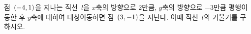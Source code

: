 점~$(-4{,}\mkern3mu\mathopen{}1)$을 지나는 직선~$l$을 $x$축의 방향으로 $2$만큼, $y$축의 방향으로 $-3$만큼 평행이동한 후 $y$축에 대하여 대칭이동하면 점~$(3{,}\mkern3mu\mathopen{}-1)$을 지난다. 이때 직선~$l$의 기울기를 구하시오.
